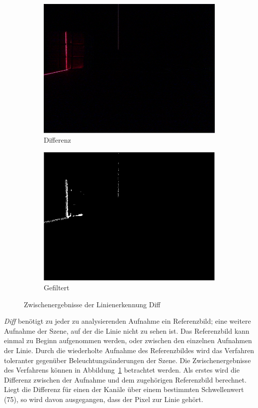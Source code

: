 \documentclass[ngerman,a4paper,parskip=half]{scrartcl}
\begin{document}
\begin{figure}[H]
\begin{subfigure}{0.23\textwidth}
	\end{subfigure}
	\hfill
	\begin{subfigure}{0.23\textwidth}
		\includegraphics[width=\textwidth]{includes/line_diff.png}
		\caption{Differenz}
	\end{subfigure}
	\hfill
	\begin{subfigure}{0.23\textwidth}
		\includegraphics[width=\textwidth]{includes/line_diff_filtered.png}
		\caption{Gefiltert}
	\end{subfigure}

	\caption{Zwischenergebnisse der Linienerkennung Diff}
	\label{fig:diff}
\end{figure}

\emph{Diff} benötigt zu jeder zu analysierenden Aufnahme ein Referenzbild; eine weitere Aufnahme der Szene, auf der die Linie nicht zu sehen ist. Das Referenzbild kann einmal zu Beginn aufgenommen werden, oder zwischen den einzelnen Aufnahmen der Linie. Durch die wiederholte Aufnahme des Referenzbildes wird das Verfahren toleranter gegenüber Beleuchtungsänderungen der Szene.
Die Zwischenergebnisse des Verfahrens können in Abbildung~\ref{fig:diff} betrachtet werden. Als erstes wird die Differenz zwischen der Aufnahme und dem zugehörigen Referenzbild berechnet.
Liegt die Differenz für einen der Kanäle über einem bestimmten Schwellenwert (75), so wird davon ausgegangen, dass der Pixel zur Linie gehört.
\end{document}
